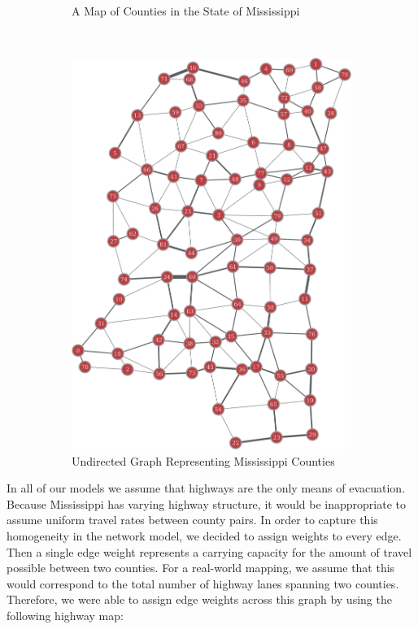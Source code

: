\documentclass[titlepage]{article}
\begin{document}
\begin{figure}[H]
\begin{subfigure}[b]{0.5\textwidth}
      \caption*{A Map of Counties in the State of Mississippi \cite{county_map}}
    \end{subfigure}~
    \begin{subfigure}[b]{0.5\textwidth}
      \center
      \includegraphics[width=\linewidth]{figures/full_undirected-crop.pdf}
      \caption*{Undirected Graph Representing Mississippi Counties}
    \end{subfigure}
    \caption*{}
  \end{figure}
  \par
    In all of our models we assume that highways are the only means of evacuation. Because Mississippi has varying highway structure, it would be inappropriate to assume uniform travel rates between county pairs. In order to capture this homogeneity in the network model, we decided to assign weights to every edge. Then a single edge weight represents a carrying capacity for the amount of travel possible between two counties. For a real-world mapping, we assume that this would correspond to the total number of highway lanes spanning two counties. Therefore, we were able to assign edge weights across this graph by using the following highway map:
\end{document}
